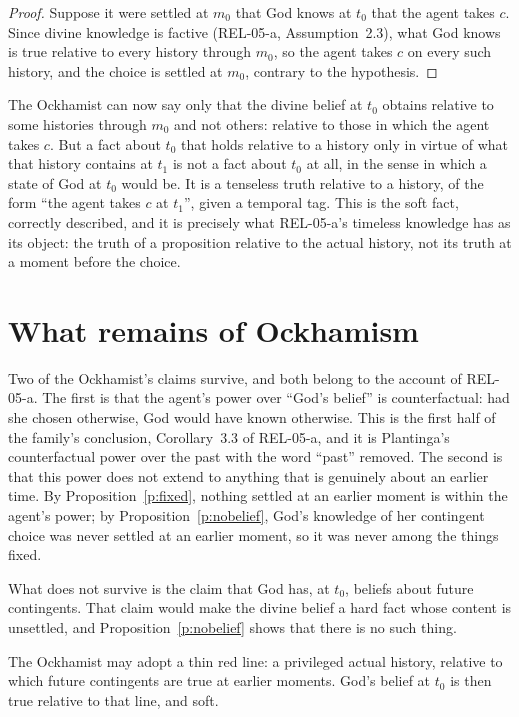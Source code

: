 \documentclass{situationist-preprint}
\begin{document}
\begin{proof}
Suppose it were settled at $m_0$ that God knows at $t_0$ that the agent takes $c$. Since divine knowledge is factive (REL-05-a, Assumption~2.3), what God knows is true relative to every history through $m_0$, so the agent takes $c$ on every such history, and the choice is settled at $m_0$, contrary to the hypothesis.
\end{proof}

The Ockhamist can now say only that the divine belief at $t_0$ obtains relative to some histories through $m_0$ and not others: relative to those in which the agent takes $c$. But a fact about $t_0$ that holds relative to a history only in virtue of what that history contains at $t_1$ is not a fact about $t_0$ at all, in the sense in which a state of God at $t_0$ would be. It is a tenseless truth relative to a history, of the form \enquote{the agent takes $c$ at $t_1$}, given a temporal tag. This is the soft fact, correctly described, and it is precisely what REL-05-a's timeless knowledge has as its object: the truth of a proposition relative to the actual history, not its truth at a moment before the choice.

\section{What remains of Ockhamism}

Two of the Ockhamist's claims survive, and both belong to the account of REL-05-a. The first is that the agent's power over \enquote{God's belief} is counterfactual: had she chosen otherwise, God would have known otherwise. This is the first half of the family's conclusion, Corollary~3.3 of REL-05-a, and it is Plantinga's counterfactual power over the past with the word \enquote{past} removed. The second is that this power does not extend to anything that is genuinely about an earlier time. By Proposition~\ref{p:fixed}, nothing settled at an earlier moment is within the agent's power; by Proposition~\ref{p:nobelief}, God's knowledge of her contingent choice was never settled at an earlier moment, so it was never among the things fixed.

What does not survive is the claim that God has, at $t_0$, beliefs about future contingents. That claim would make the divine belief a hard fact whose content is unsettled, and Proposition~\ref{p:nobelief} shows that there is no such thing.

\begin{objection}
The Ockhamist may adopt a thin red line: a privileged actual history, relative to which future contingents are true at earlier moments. God's belief at $t_0$ is then true relative to that line, and soft.
\end{objection}
\end{document}

